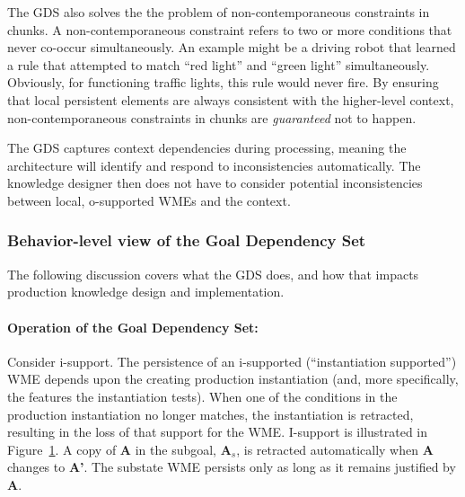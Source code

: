 The GDS also solves the the problem of non-contemporaneous constraints in chunks. A non-contemporaneous constraint refers to two or more conditions that never co-occur simultaneously. An example might be a driving robot that learned a rule that attempted to match ``red light'' and ``green light'' simultaneously. Obviously, for functioning traffic lights, this rule would never fire. By ensuring that local persistent elements are always consistent with the higher-level context, non-contemporaneous constraints in chunks are \emph{guaranteed} not to happen.

The GDS captures context dependencies during processing, meaning the architecture will identify and respond to inconsistencies automatically.  The knowledge designer then does not have to consider potential inconsistencies between local, o-supported WMEs and the context.


\subsubsection{Behavior-level view of the Goal Dependency Set}

The following discussion covers what the GDS does, and how that impacts production knowledge design and implementation.

\paragraph{Operation of the Goal Dependency Set:}

\begin{figure}
	\label{'ncc'}
\end{figure}

Consider i-support. The persistence of an i-supported (``instantiation supported'') WME depends upon the creating production instantiation (and, more specifically, the features the instantiation tests). When one of the conditions in the production instantiation no longer matches, the instantiation is retracted, resulting in the loss of that support for the WME. I-support is illustrated in Figure~\ref{'ncc'}. A copy of {\bf A} in the subgoal, {\bf A$_s$}, is retracted automatically when {\bf A} changes to {\bf A'}. The substate WME persists only as long as it remains justified by {\bf A}.

